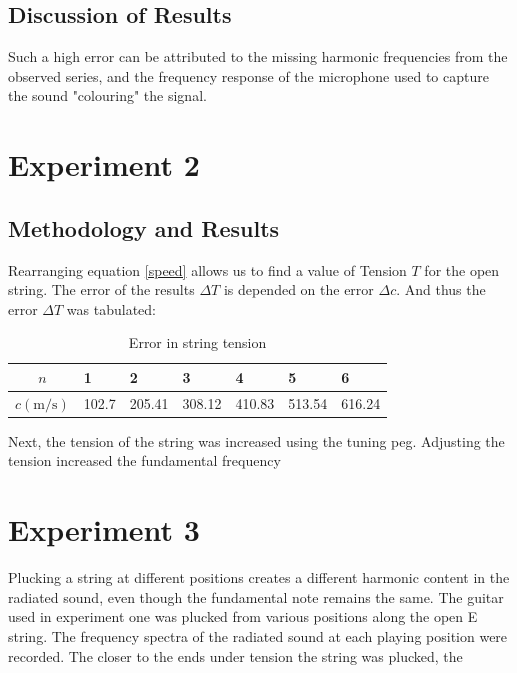 \documentclass[11pt]{article}
\begin{document}
        \subsection{Discussion of Results}
            Such a high error can be attributed to the missing harmonic frequencies from the observed series, and the frequency response of the microphone used to capture the sound "colouring" the signal.
    \section{Experiment 2}
            \subsection{Methodology and Results}
            Rearranging equation \ref{speed} allows us to find a value of Tension $T$ for the open string.
            The error of the results $\Delta T$ is depended on the error $\Delta c$. And thus the error $\Delta T$ was tabulated:
            \begin{table}[H]
                \centering
                \begin{tabular}{c | l l l l l l}
                    \hline
                    $n$ & 1 & 2 & 3 & 4 & 5 & 6 \\
                    \hline
                    $c(\si{\meter\per\second})$ & 102.7 & 205.41 & 308.12 & 410.83 & 513.54 & 616.24 \\
                    \hline
                \end{tabular}
                \caption{Error in string tension}
            \end{table}
            Next, the tension of the string was increased using the tuning peg.
            Adjusting the tension increased the fundamental frequency
    \section{Experiment 3}
        Plucking a string at different positions creates a different harmonic content in the radiated sound, even though the fundamental note remains the same.
        The guitar used in experiment one was plucked from various positions along the open E string.
        The frequency spectra of the radiated sound at each playing position were recorded. The closer to the ends under tension the string was plucked, the
        
\end{document}
